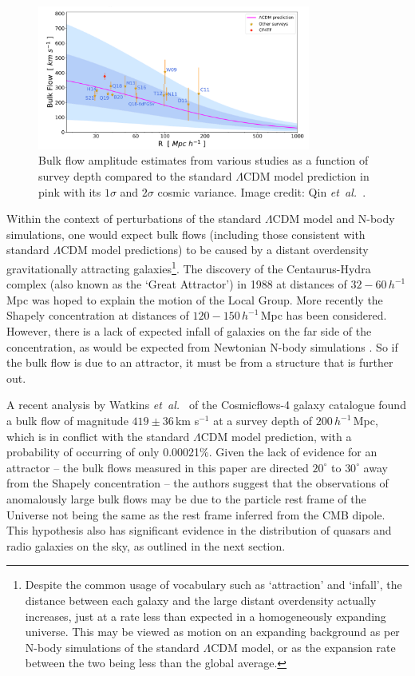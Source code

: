 \documentclass[a4paper,12pt]{report}
\newcommand{\degree}{^\circ}
\newcommand{\etal}{\emph{et~al.\ }}
\begin{document}
\begin{figure}[t]
  \centering
  \includegraphics[width=0.8\textwidth]{Bulk Flow Measurements (Qin et al).png}
  \caption{Bulk flow amplitude estimates from various studies as a function of survey depth compared to the standard $\Lambda$CDM model prediction in pink with its $1\sigma$ and $2\sigma$ cosmic variance. Image credit: Qin \etal \cite{RN117}.}
  \label{fig: bulk flow measurements}
\end{figure}

Within the context of perturbations of the standard $\Lambda$CDM model and N-body simulations, one would expect bulk flows (including those consistent with standard $\Lambda$CDM model predictions) to be caused by a distant overdensity gravitationally attracting galaxies\footnote{Despite the common usage of vocabulary such as `attraction' and `infall', the distance between each galaxy and the large distant overdensity actually increases, just at a rate less than expected in a homogeneously expanding universe. This may be viewed as motion on an expanding background as per N-body simulations of the standard $\Lambda$CDM model, or as the expansion rate between the two being less than the global average.}.
The discovery of the Centaurus-Hydra complex (also known as the `Great Attractor') in 1988 at distances of $32 - 60\, h^{-1}\,$Mpc \cite{RN75} was hoped to explain the motion of the Local Group. More recently the Shapely concentration at distances of $120 - 150\, h^{-1}\,$Mpc has been considered. However, there is a lack of expected infall of galaxies on the far side of the concentration, as would be expected from Newtonian N-body simulations \cite{RN77}. So if the bulk flow is due to an attractor, it must be from a structure that is further out.

A recent analysis by Watkins \etal \cite{RN233} of the Cosmicflows-4 galaxy catalogue \cite{RN234} found a bulk flow of magnitude $419 \pm 36\,$km s$^{-1}$ at a survey depth of $200\,h^{-1}\,$Mpc, which is in conflict with the standard $\Lambda$CDM model prediction, with a probability of occurring of only 0.00021\%. Given the lack of evidence for an attractor -- the bulk flows measured in this paper are directed $20\degree$ to $30\degree$ away from the Shapely concentration -- the authors suggest that the observations of anomalously large bulk flows may be due to the particle rest frame of the Universe not being the same as the rest frame inferred from the CMB dipole. This hypothesis also has significant evidence in the distribution of quasars and radio galaxies on the sky, as outlined in the next section.
\end{document}

